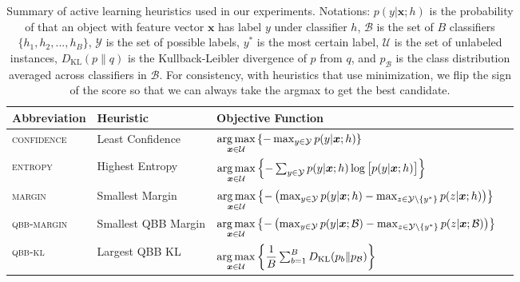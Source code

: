 \documentclass[fleqn,10pt,lineno]{wlpeerj} %
\newcommand{\B}{\mathcal{B}}
\newcommand{\Y}{\mathcal{Y}}
\newcommand{\Unlabeled}{\mathcal{U}}
\newcommand*{\argmax}{\operatornamewithlimits{arg\,max}\limits}
\begin{document}
\begin{table}[t]
	\caption {Summary of active learning heuristics used in our experiments.
			  Notations: $p(y | \bm{x}; h)$ is the probability of that an
			  object with feature vector $\bm{x}$ has label $y$ under
			  classifier $h$, $\B$ is the set of $B$ classifiers $\{h_1, h_2,
			  ..., h_B\}$, $\Y$ is the set of possible labels, $y^*$ is the
			  most certain label, $\Unlabeled$ is the set of unlabeled
			  instances, $D_{\mathrm{KL}}(p\|q)$ is the Kullback-Leibler
			  divergence of $p$ from $q$, and $p_\B$ is the class distribution
			  averaged across classifiers in $\B$. For consistency, with
			  heuristics that use minimization, we flip the sign of the score
			  so that we can always take the argmax to get the best candidate.}
	\label{tab:heuristics}
	\centering
	\begin{tabular}{llll}
		\toprule
		Abbreviation & {Heuristic}  &  Objective Function  \\
		\midrule
        \textsc{confidence} & Least Confidence &
			$\argmax_{\bm{x} \in \Unlabeled}
			\left\{ - \max_{y \in \Y} p(y | \bm{x}; h) \right\}$ \\
		\textsc{entropy} & Highest Entropy &
			$\argmax_{\bm{x} \in \Unlabeled} \left\{-\sum_{y \in \Y} p(y | \bm{x}; h)
            \log \big[ p(y | \bm{x}; h) \big] \right\}$
			\\[2ex]
		\textsc{margin} & Smallest Margin &
			$\argmax_{\bm{x} \in \Unlabeled} \left\{ - \left( \max_{y \in \Y} p(y | \bm{x}; h) -
            \max_{z \in \Y \setminus \{y^*\}} p(z | \bm{x}; h) \right) \right\}$
			\\[2ex]
		\textsc{qbb-margin} & Smallest QBB Margin &
			$\argmax_{\bm{x} \in \Unlabeled} \left\{ - \left( \max_{y \in \Y} p(y | \bm{x}; \B) -
            \max_{z \in \Y \setminus \{y^*\}} p(z | \bm{x}; \B) \right) \right\}$
			\\[2ex]
		\textsc{qbb-kl} & Largest QBB KL &
			$\argmax_{\bm{x} \in \Unlabeled} \left\{ \dfrac{1}{B}
               \sum_{b=1}^B D_{\mathrm{KL}}(p_b\|p_\B) \right\}$
			\\
		\bottomrule
	\end{tabular}
\end{table}
\end{document}
